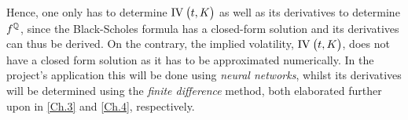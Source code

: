 Hence, one only has to determine $\IV{t,K}$ as well as its derivatives to determine $f^{\mathbb{Q}}$, since the Black-Scholes formula has a closed-form solution and its derivatives can thus be derived. On the contrary, the implied volatility, $\IV{t,K}$, does not have a closed form solution as it has to be approximated numerically. In the project's application this will be done using \emph{neural networks}, whilst its derivatives will be determined using the \emph{finite difference} method, both elaborated further upon in \autoref{Ch.3} and \autoref{Ch.4}, respectively.
